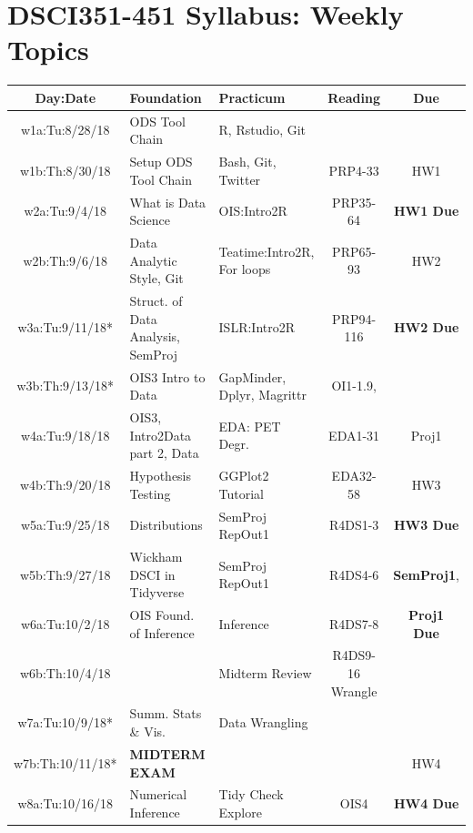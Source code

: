 \documentclass[11pt]{article} %
\begin{document}
\section{DSCI351-451 Syllabus: Weekly Topics}
\begin{table}[h] 
	\centering %
	\begin{tabular}{| c | p{3.4cm} | p{3.4cm} | c | c |} %
	\hline %
	Day:Date & Foundation & Practicum  & Reading & Due  \\ %
	\hline 
	\hline %
  w1a:Tu:8/28/18 & ODS Tool Chain & R, Rstudio, Git & & \\ %
	\hline %
	w1b:Th:8/30/18 & Setup ODS Tool Chain & Bash, Git, Twitter & PRP4-33 & HW1 \\ 
	\hline  
	\hline
	w2a:Tu:9/4/18 & What is Data Science & OIS:Intro2R  & PRP35-64 & {\bf HW1 Due} \\ 
	\hline
	w2b:Th:9/6/18 &  Data Analytic Style, Git & Teatime:Intro2R, For loops & PRP65-93 & HW2 \\
	\hline 
	\hline
	w3a:Tu:9/11/18* & Struct. of Data Analysis, SemProj & ISLR:Intro2R & PRP94-116 & {\bf HW2 Due}\\ 
	\hline
	w3b:Th:9/13/18* & OIS3 Intro to Data & GapMinder, Dplyr, Magrittr & OI1-1.9, &  \\
	\hline
	\hline 
	w4a:Tu:9/18/18 & OIS3, Intro2Data part 2, Data & EDA: PET Degr. & EDA1-31 & Proj1  \\ 
	\hline
	w4b:Th:9/20/18 & Hypothesis Testing & GGPlot2 Tutorial & EDA32-58 & HW3 \\
	\hline
	\hline 
	w5a:Tu:9/25/18 & Distributions & SemProj RepOut1  & R4DS1-3 &  {\bf HW3 Due} \\ 
	\hline
	w5b:Th:9/27/18 & Wickham DSCI in Tidyverse & SemProj RepOut1 & R4DS4-6  & {\bf SemProj1}, \\
	\hline
	\hline 
	w6a:Tu:10/2/18 & OIS Found. of Inference & Inference  & R4DS7-8 & {\bf Proj1 Due} \\ 
	\hline
	w6b:Th:10/4/18 &  & Midterm Review & R4DS9-16 Wrangle & \\
	\hline
	\hline 
	w7a:Tu:10/9/18* & Summ. Stats \& Vis.  & Data Wrangling &  & \\ 
	\hline
	w7b:Th:10/11/18* & {\bf MIDTERM EXAM} &  &  & HW4 \\
	\hline
	\hline 
	w8a:Tu:10/16/18 & Numerical Inference &  Tidy Check Explore  & OIS4 & {\bf HW4 Due}\\ 

\end{tabular}
\end{table}
\end{document}
